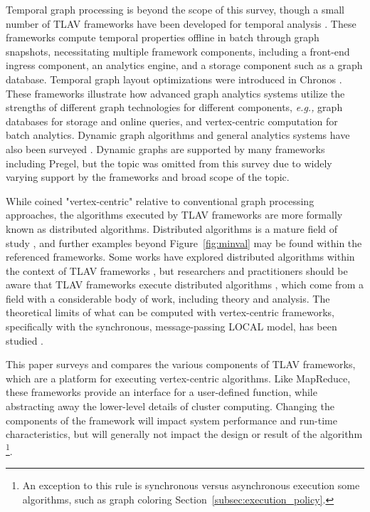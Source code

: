 \documentclass[reprint,twocolumn,showpacs,preprintnumbers,amsmath, aps,pre,amssymb]{revtex4-1}
\begin{document}
Temporal graph processing is beyond the scope of this survey, though a small number of TLAV frameworks have been developed for temporal analysis \cite{Cheng2012,Hant2014}.  These frameworks compute temporal properties offline in batch through graph snapshots, necessitating multiple framework components, including a front-end ingress component, an analytics engine, and a storage component such as a graph database.  Temporal  graph layout optimizations were introduced in Chronos \cite{Hant2014}.  These frameworks illustrate how advanced graph analytics systems utilize the strengths of different graph technologies for different components, {\em e.g.,} graph databases for storage and online queries, and vertex-centric computation for batch analytics.  Dynamic graph algorithms and general analytics systems have also been surveyed \cite{Aggarwal2014,Vaquero2014}.  Dynamic graphs are supported by many frameworks including Pregel, but the topic was omitted from this survey due to widely varying support by the frameworks and broad scope of the topic.

While coined "vertex-centric" relative to conventional graph processing approaches, the algorithms executed by TLAV frameworks are more formally known as distributed algorithms.  Distributed algorithms is a mature field of study \cite{Lynch1996}, and further examples beyond Figure~\ref{fig:minval} may be found within the referenced frameworks.  Some works have explored distributed algorithms within the context of TLAV frameworks \cite{Yan2013}, but researchers and practitioners should be aware that TLAV frameworks execute distributed algorithms \cite{Lynch1996}, which come from a field with a considerable body of work, including theory and analysis.  The theoretical limits of what can be computed with vertex-centric frameworks, specifically with the synchronous, message-passing LOCAL model, has been studied \cite{kuhn2010}.  

This paper surveys and compares the various components of TLAV frameworks, which are a platform for executing vertex-centric algorithms.  Like MapReduce, these frameworks provide an interface for a user-defined function, while abstracting away the lower-level details of cluster computing.  Changing the components of the framework will impact system performance and run-time characteristics, but will generally not impact the design or result of the algorithm \footnote{An exception to this rule is synchronous versus asynchronous execution some algorithms, such as graph coloring Section~\ref{subsec:execution_policy}.}.
\end{document}
